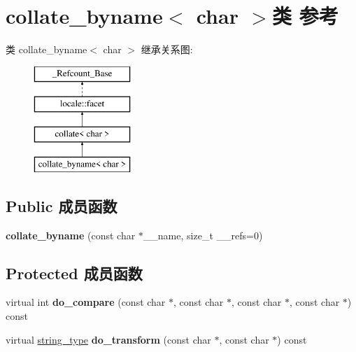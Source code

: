 \hypertarget{classcollate__byname_3_01char_01_4}{}\section{collate\+\_\+byname$<$ char $>$类 参考}
\label{classcollate__byname_3_01char_01_4}
类 collate\+\_\+byname$<$ char $>$ 继承关系图\+:\begin{figure}[H]
\begin{center}
\leavevmode
\includegraphics[height=4.000000cm]{classcollate__byname_3_01char_01_4}
\end{center}
\end{figure}
\subsection*{Public 成员函数}
\begin{DoxyCompactItemize}
\item 
\mbox{\label{classcollate__byname_3_01char_01_4_af78ab594613f7e87d3bad13ba281e783}} 
{\bfseries collate\+\_\+byname} (const char $\ast$\+\_\+\+\_\+name, size\+\_\+t \+\_\+\+\_\+refs=0)
\end{DoxyCompactItemize}
\subsection*{Protected 成员函数}
\begin{DoxyCompactItemize}
\item 
\mbox{\label{classcollate__byname_3_01char_01_4_a39d806bc03ec9b9222765b050492a7a2}} 
virtual int {\bfseries do\+\_\+compare} (const char $\ast$, const char $\ast$, const char $\ast$, const char $\ast$) const
\item 
\mbox{\label{classcollate__byname_3_01char_01_4_a21c8a77dc9dc48d7ec3b39dae97b80c5}} 
virtual \hyperlink{structstring}{string\+\_\+type} {\bfseries do\+\_\+transform} (const char $\ast$, const char $\ast$) const
\end{DoxyCompactItemize}
